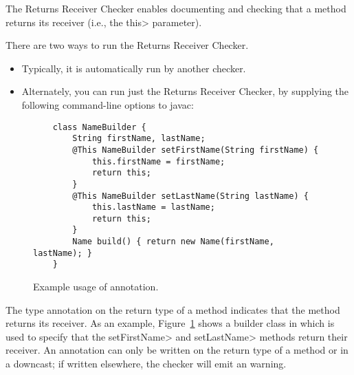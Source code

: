 \htmlhr
{}

The Returns Receiver Checker enables documenting and checking that a method
returns its receiver (i.e., the \<this> parameter).

There are two ways to run the Returns Receiver Checker.
\begin{itemize}
\item
Typically, it is automatically run by another checker.
\item
Alternately, you can run just the Returns Receiver Checker, by
supplying the following command-line options to javac:
\end{itemize}



\begin{figure}
    \begin{Verbatim}
    class NameBuilder {
        String firstName, lastName;
        @This NameBuilder setFirstName(String firstName) {
            this.firstName = firstName;
            return this;
        }
        @This NameBuilder setLastName(String lastName) {
            this.lastName = lastName;
            return this;
        }
        Name build() { return new Name(firstName, lastName); }
    }
    \end{Verbatim}
    \caption{Example usage of  annotation.}
    \label{fig-this-annot-example}
\end{figure}

The type annotation  on the return
type of a method indicates that the method returns its receiver. As an example,
Figure~\ref{fig-this-annot-example} shows a builder class in which
 is used to specify that the
\<setFirstName> and \<setLastName> methods return their receiver.  An
 annotation can only be written on
the return type of a method or in a downcast; if written elsewhere, the checker
will emit an  warning.


